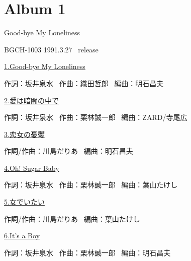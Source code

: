 
\chapter{Album 1}
\thispagestyle{empty} %
\vspace{-16mm}
\LARGE {Good-bye My Loneliness}

\normalsize{BGCH-1003 1991.3.27 \ release}
\\

\vspace{-5mm}


\small{\hyperlink{1_0}{1.Good-bye My Loneliness}}

\tiny{作詞：坂井泉水 \ 作曲：織田哲郎 \ 編曲：明石昌夫}

\small{\hyperlink{1_1}{2.愛は暗闇の中で}}

\tiny{作詞：坂井泉水 \ 作曲：栗林誠一郎 \ 編曲：ZARD/寺尾広}

\small{\hyperlink{1_2}{3.恋女の憂鬱 }}

\tiny{作詞/作曲：川島だりあ \ 編曲：明石昌夫}

\small{\hyperlink{1_3}{4.Oh! Sugar Baby}}

\tiny{作詞：坂井泉水 \ 作曲：栗林誠一郎 \ 編曲：葉山たけし}

\small{\hyperlink{1_4}{5.女でいたい }}

\tiny{作詞/作曲：川島だりあ \ 編曲：葉山たけし}

\small{\hyperlink{1_5}{6.It's a Boy}}

\tiny{作詞：坂井泉水 \ 作曲：栗林誠一郎 \ 編曲：明石昌夫}

\small{ \ }

\tiny{ \ }

\small{ \ }

\tiny{ \ }

\small{ \ }

\tiny{ \ }

\small{ \ }

\tiny{ \ }

\small{ \ }

\tiny{ \ }

\small{ \ }

\tiny{ \ }

\clearpage
